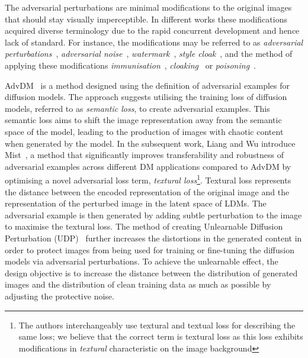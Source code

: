 \documentclass[conference]{IEEEtran}
\begin{document}
The adversarial perturbations are minimal modifications to the original images that should stay visually imperceptible. 
In different works these modifications acquired diverse terminology due to the rapid concurrent development and hence lack of standard. For instance, the modifications may be referred to as \textit{adversarial perturbations}~\cite{liang_adversarial_2023,liang_mist_2023}, \textit{adversarial noise}~\cite{zhao_unlearnable_2023}, \textit{watermark}~\cite{ye_duaw_2023}, \textit{style cloak}~\cite{shan_glaze_2023}, and the method of applying these modifications \textit{immunisation}~\cite{salman_raising_2023}, \textit{cloaking}~\cite{shan_glaze_2023} or \textit{poisoning}~\cite{liu_toward_2023}. 
 
 AdvDM~\cite{liang_adversarial_2023} is a method designed using the definition of adversarial examples for diffusion models. 
 The approach suggests utilising the training loss of diffusion models, referred to as \textit{semantic loss}, to create adversarial examples. 
 This semantic loss aims to shift the image representation away from the semantic space of the model, leading to the production of images with chaotic content when generated by the model.
In the subsequent work, Liang and Wu introduce Mist~\cite{liang_mist_2023}, a method that significantly improves transferability and robustness of adversarial examples across different DM applications compared to AdvDM by optimising a novel adversarial loss term, \textit{textural loss}\footnote{The authors interchangeably use textural and textual loss for describing the same loss; we believe that the correct term is textural loss as this loss exhibits modifications in \textit{textural} characteristic on the image background}. 
Textural loss represents the distance between the encoded representation of the original image and the representation of the perturbed image in the latent space of LDMs. 
The adversarial example is then generated by adding subtle perturbation to the image to maximise the textural loss. %
The method of creating Unlearnable Diffusion Perturbation (UDP)~\cite{zhao_unlearnable_2023} further increases the distortions in the generated content in order to protect images from being used for training or fine-tuning the diffusion models via adversarial perturbations. 
To achieve the unlearnable effect, the design objective is to increase the distance between the distribution of generated images and the distribution of clean training data as much as possible by adjusting the protective noise.
\end{document}
